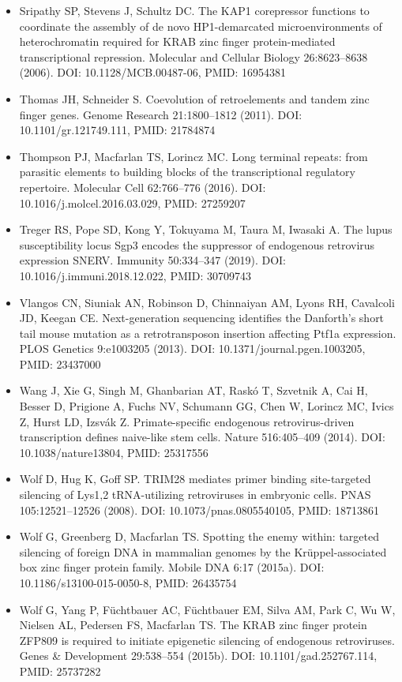 \documentclass[11pt,a4paper]{article}
\begin{document}
\begin{itemize}
\item Sripathy SP, Stevens J, Schultz DC. The KAP1 corepressor functions to coordinate the assembly of de novo HP1-demarcated microenvironments of heterochromatin required for KRAB zinc finger protein-mediated transcriptional repression. Molecular and Cellular Biology 26:8623–8638 (2006). DOI: 10.1128/MCB.00487-06, PMID: 16954381
\item Thomas JH, Schneider S. Coevolution of retroelements and tandem zinc finger genes. Genome Research 21:1800–1812 (2011). DOI: 10.1101/gr.121749.111, PMID: 21784874
\item Thompson PJ, Macfarlan TS, Lorincz MC. Long terminal repeats: from parasitic elements to building blocks of the transcriptional regulatory repertoire. Molecular Cell 62:766–776 (2016). DOI: 10.1016/j.molcel.2016.03.029, PMID: 27259207
\item Treger RS, Pope SD, Kong Y, Tokuyama M, Taura M, Iwasaki A. The lupus susceptibility locus Sgp3 encodes the suppressor of endogenous retrovirus expression SNERV. Immunity 50:334–347 (2019). DOI: 10.1016/j.immuni.2018.12.022, PMID: 30709743
\item Vlangos CN, Siuniak AN, Robinson D, Chinnaiyan AM, Lyons RH, Cavalcoli JD, Keegan CE. Next-generation sequencing identifies the Danforth's short tail mouse mutation as a retrotransposon insertion affecting Ptf1a expression. PLOS Genetics 9:e1003205 (2013). DOI: 10.1371/journal.pgen.1003205, PMID: 23437000
\item Wang J, Xie G, Singh M, Ghanbarian AT, Raskó T, Szvetnik A, Cai H, Besser D, Prigione A, Fuchs NV, Schumann GG, Chen W, Lorincz MC, Ivics Z, Hurst LD, Izsvák Z. Primate-specific endogenous retrovirus-driven transcription defines naive-like stem cells. Nature 516:405–409 (2014). DOI: 10.1038/nature13804, PMID: 25317556
\item Wolf D, Hug K, Goff SP. TRIM28 mediates primer binding site-targeted silencing of Lys1,2 tRNA-utilizing retroviruses in embryonic cells. PNAS 105:12521–12526 (2008). DOI: 10.1073/pnas.0805540105, PMID: 18713861
\item Wolf G, Greenberg D, Macfarlan TS. Spotting the enemy within: targeted silencing of foreign DNA in mammalian genomes by the Krüppel-associated box zinc finger protein family. Mobile DNA 6:17 (2015a). DOI: 10.1186/s13100-015-0050-8, PMID: 26435754
\item Wolf G, Yang P, Füchtbauer AC, Füchtbauer EM, Silva AM, Park C, Wu W, Nielsen AL, Pedersen FS, Macfarlan TS. The KRAB zinc finger protein ZFP809 is required to initiate epigenetic silencing of endogenous retroviruses. Genes \& Development 29:538–554 (2015b). DOI: 10.1101/gad.252767.114, PMID: 25737282

\end{itemize}
\end{document}
